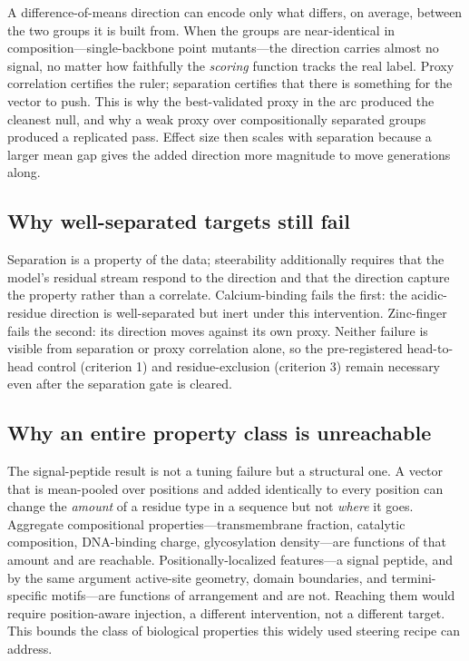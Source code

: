 \documentclass{article}
\begin{document}
A difference-of-means direction can encode only what differs, on average,
between the two groups it is built from. When the groups are near-identical in
composition---single-backbone point mutants---the direction carries almost no
signal, no matter how faithfully the \emph{scoring} function tracks the real
label. Proxy correlation certifies the ruler; separation certifies that there
is something for the vector to push. This is why the best-validated proxy in the
arc produced the cleanest null, and why a weak proxy over compositionally
separated groups produced a replicated pass. Effect size then scales with
separation because a larger mean gap gives the added direction more magnitude to
move generations along.

\subsection{Why well-separated targets still fail}

Separation is a property of the data; steerability additionally requires that
the model's residual stream respond to the direction and that the direction
capture the property rather than a correlate. Calcium-binding fails the first:
the acidic-residue direction is well-separated but inert under this
intervention. Zinc-finger fails the second: its direction moves against its own
proxy. Neither failure is visible from separation or proxy correlation alone,
so the pre-registered head-to-head control (criterion 1) and residue-exclusion
(criterion 3) remain necessary even after the separation gate is cleared.

\subsection{Why an entire property class is unreachable}

The signal-peptide result is not a tuning failure but a structural one. A vector
that is mean-pooled over positions and added identically to every position can
change the \emph{amount} of a residue type in a sequence but not \emph{where}
it goes. Aggregate compositional properties---transmembrane fraction, catalytic
composition, DNA-binding charge, glycosylation density---are functions of that
amount and are reachable. Positionally-localized features---a signal peptide,
and by the same argument active-site geometry, domain boundaries, and
termini-specific motifs---are functions of arrangement and are not. Reaching
them would require position-aware injection, a different intervention, not a
different target. This bounds the class of biological properties this widely
used steering recipe can address.
\end{document}
